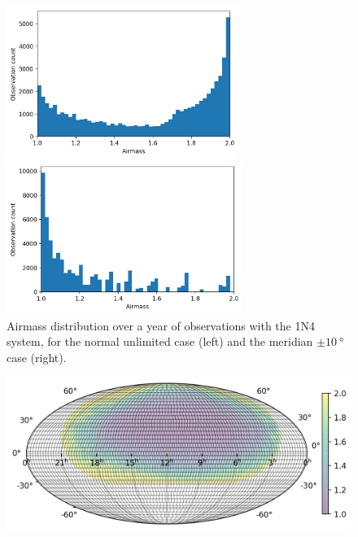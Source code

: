 \begin{colsection}
\begin{colsection}
\begin{figure}[p]
    \begin{center}
        \begin{minipage}[t]{0.49\textwidth}\vspace{10pt}
            \includegraphics[height=140pt]{images/survey_sims/365_1N4_lite_airmass3.png}
        \end{minipage}
        \begin{minipage}[t]{0.49\textwidth}\vspace{10pt}
            \includegraphics[height=140pt]{images/survey_sims/365_1N4_meridian_airmass3.png}
        \end{minipage}
    \end{center}

    \caption[Airmass distribution over a year of observations]{
        Airmass distribution over a year of observations with the 1N4 system, for the normal unlimited case (left) and the meridian $\pm\SI{10}{\degree}$ case (right).
    }\label{fig:survey_sim_airmass_365}
\end{figure}

\begin{figure}[p]
    \begin{center}
        \includegraphics[width=0.7\linewidth]{images/survey_sims/30_1N4_lite_airmass.png}
    \end{center}


\end{figure}
\end{colsection}
\end{colsection}
